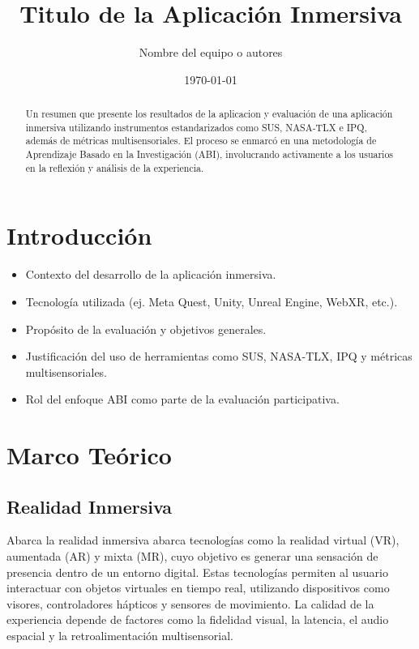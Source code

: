 \documentclass[12pt]{article}
\title{Titulo de la Aplicación Inmersiva }
\author{Nombre del equipo o autores}
\date{\today}
\begin{document}
\maketitle

\begin{abstract}
Un resumen que presente los resultados de la aplicacion y evaluación de una aplicación inmersiva utilizando instrumentos estandarizados como SUS, NASA-TLX e IPQ, además de métricas multisensoriales. El proceso se enmarcó en una metodología de Aprendizaje Basado en la Investigación (ABI), involucrando activamente a los usuarios en la reflexión y análisis de la experiencia.
\end{abstract}

\tableofcontents
\newpage

\section{Introducción}
\begin{itemize}
    \item Contexto del desarrollo de la aplicación inmersiva.
    \item Tecnología utilizada (ej. Meta Quest, Unity, Unreal Engine, WebXR, etc.).
    \item Propósito de la evaluación y objetivos generales.
    \item Justificación del uso de herramientas como SUS, NASA-TLX, IPQ y métricas multisensoriales.
    \item Rol del enfoque ABI como parte de la evaluación participativa.
\end{itemize}

\section{Marco Teórico}

\subsection{Realidad Inmersiva}
Abarca la realidad inmersiva abarca tecnologías como la realidad virtual (VR), aumentada (AR) y mixta (MR), cuyo objetivo es generar una sensación de presencia dentro de un entorno digital. Estas tecnologías permiten al usuario interactuar con objetos virtuales en tiempo real, utilizando dispositivos como visores, controladores hápticos y sensores de movimiento. La calidad de la experiencia depende de factores como la fidelidad visual, la latencia, el audio espacial y la retroalimentación multisensorial.
\end{document}

